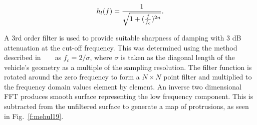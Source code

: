 
\begin{equation}
\label{eq:eq8}
\centering
	h_{l}(f) = \frac{1}{\sqrt{1 + (\frac{f}{f_c})^{2n}}}.
\end{equation}

A 3rd order filter is used to provide suitable sharpness of damping with $3$ dB attenuation at the cut-off frequency. This was determined using the method described in ~\cite{Lyons1997} ~\cite{Kalogerakis2010} as $f_c = 2/\sigma$, where $\sigma$ is taken as the diagonal length of the vehicle's geometry as a multiple of the sampling resolution. The filter function is rotated around the zero frequency to form a $N\times N$ point filter and multiplied to the frequency domain values element by element. An inverse two dimensional FFT produces smooth surface representing the low frequency component. This is subtracted from the unfiltered surface to generate a map of protrusions, as seen in Fig.~\ref{f:mehul19}.




